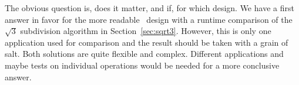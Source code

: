 \noindent
The obvious question is, does it matter, and if, for which design. We
have a first answer in favor for the more readable \cgal\ design with
a runtime comparison of the $\sqrt{3}$ subdivision algorithm in
Section~\ref{sec:sqrt3}. However, this is only one application used
for comparison and the result should be taken with a grain of salt.
Both solutions are quite flexible and complex. Different applications
and maybe tests on individual operations would be needed for a more
conclusive answer. 
















